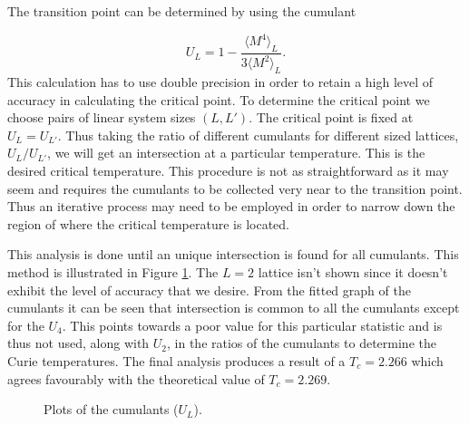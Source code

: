 \documentclass[a4paper]{article}
\begin{document}
The transition point can be determined by using the cumulant

\begin{equation}
  \label{eq:cum2}
  U_L=1-\frac{\langle M^4 \rangle_L}{3\langle M^2 \rangle_L}.
\end{equation}This calculation has to use double precision in order to retain a high
level of accuracy in calculating the critical point. To determine the
critical point we choose pairs of linear system sizes $(L,L')$. The
critical point is fixed at $U_L=U_{L'}$. Thus taking the ratio of
different cumulants for different sized lattices, $U_L/U_{L'}$, we will get an
intersection at a particular temperature. This is the desired critical
temperature. This procedure is not as straightforward as it may seem
and requires the cumulants to be collected very near to the transition 
point. Thus an iterative process may need to be employed
in order to narrow down the region of where the critical temperature is
located. 

This analysis is done until an unique intersection is found
for all cumulants. This method is illustrated in Figure
\ref{fig:cum}. The $L=2$ lattice isn't shown since 
it doesn't exhibit the level of accuracy that we desire. From the
fitted graph of the cumulants it can be seen that intersection is
common to all the cumulants except for the $U_4$. This points towards
a poor value for this particular statistic and is thus not used, along
with $U_2$, in the ratios of the cumulants to determine the Curie temperatures.
The final analysis produces a result of a $T_c=2.266$ which agrees favourably with the
theoretical value of $T_c=2.269$. 
\begin{figure}[htb]
  \centering
  \caption{Plots of the cumulants ($U_L$).} \label{fig:cum}
\end{figure}
\end{document}
